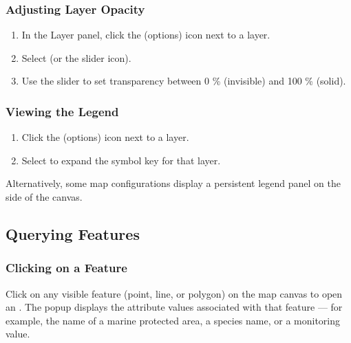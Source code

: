 \documentclass[letterpaper,10pt,english]{sphinxmanual}
\begin{document}
\subsubsection{Adjusting Layer Opacity}
\label{\detokenize{en/04_exploring_maps:adjusting-layer-opacity}}\begin{enumerate}
%
\item {} 
\sphinxAtStartPar
In the Layer panel, click the  (options) icon next to a layer.

\item {} 
\sphinxAtStartPar
Select  (or the slider icon).

\item {} 
\sphinxAtStartPar
Use the  slider to set transparency between 0 \% (invisible) and 100 \% (solid).

\end{enumerate}


\subsubsection{Viewing the Legend}
\label{\detokenize{en/04_exploring_maps:viewing-the-legend}}\begin{enumerate}
%
\item {} 
\sphinxAtStartPar
Click the  (options) icon next to a layer.

\item {} 
\sphinxAtStartPar
Select  to expand the symbol key for that layer.

\end{enumerate}

\sphinxAtStartPar
Alternatively, some map configurations display a persistent legend panel on the side
of the canvas.


\subsection{Querying Features}
\label{\detokenize{en/04_exploring_maps:querying-features}}

\subsubsection{Clicking on a Feature}
\label{\detokenize{en/04_exploring_maps:clicking-on-a-feature}}
\sphinxAtStartPar
Click on any visible feature (point, line, or polygon) on the map canvas to open an
. The pop\sphinxhyphen{}up displays the attribute values associated with that
feature — for example, the name of a marine protected area, a species name, or a
monitoring value.
\end{document}
